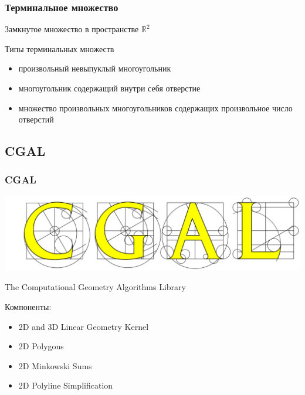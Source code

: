 \documentclass{beamer}
\newcommand{\dimension}{\mathbb{R}^2}
\begin{document}
  \begin{frame}
    \frametitle{Терминальное множество}
    
    Замкнутое множество в пространстве $\dimension$

    \begin{block}{Типы терминальных множеств}
      \begin{itemize}
        \item произвольный невыпуклый многоугольник
        \item многоугольник содержащий внутри себя отверстие
        \item множество произвольных многоугольников содержащих произвольное число отверстий
      \end{itemize}
    \end{block}

  \end{frame}
  

   \subsection{CGAL} 
  
   \begin{frame}
     \frametitle{CGAL}
     \includegraphics[width=1.0\textwidth]{cgal-logo}
 
     The Computational Geometry Algorithms Library
 
     Компоненты:
 
     \begin{itemize}
         \item 2D and 3D Linear Geometry Kernel
         \item 2D Polygons
         \item 2D Minkowski Sums
         \item 2D Polyline Simplification
     \end{itemize}
 
    \end{frame}


  
\end{document}
